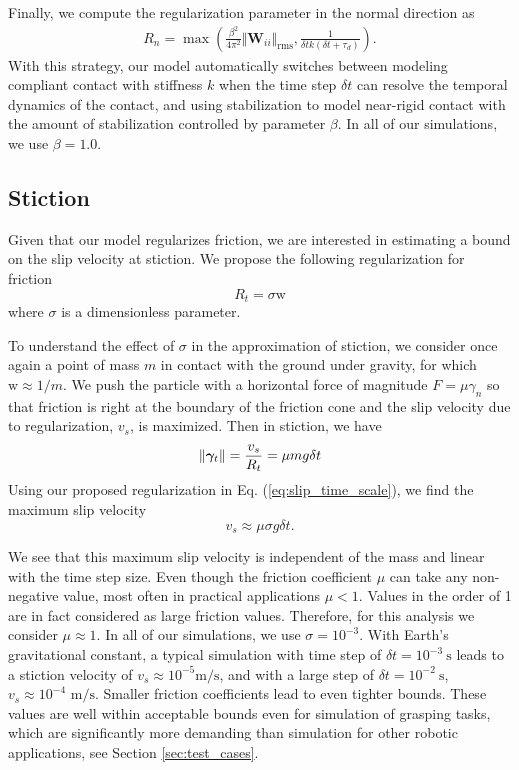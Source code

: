 Finally, we compute the regularization parameter in the normal direction as
\begin{eqnarray}
    R_n = \max\left(\frac{\beta^2}{4\pi^2}\Vert\mathbf{W}_{ii}\Vert_\text{rms}, 
    \frac{1}{\delta t k(\delta t+\tau_d)}\right)
    \label{eq:normal_regularization}.
\end{eqnarray}
With this strategy, our model automatically switches between modeling compliant
contact with stiffness $k$ when the time step $\delta t$ can resolve the
temporal dynamics of the contact, and using stabilization to model near-rigid
contact with the amount of stabilization controlled by parameter
$\beta$. In all of our simulations, we use $\beta=1.0$.

\subsection{Stiction}
Given that our model regularizes friction, we are interested in estimating a bound on
the slip velocity at stiction. We propose the following regularization for friction
\begin{equation}
    R_t = \sigma \text{w}
    \label{eq:slip_time_scale}
\end{equation}
where $\sigma$ is a dimensionless parameter.

To understand the effect of $\sigma$ in the approximation of stiction, we
consider once again a point of mass $m$ in contact with the ground under gravity,
for which $\text{w}\approx 1/m$. We push the particle with a horizontal force of magnitude
$F=\mu\gamma_n$ so that friction is right at the boundary of the friction cone and
the slip velocity due to regularization, $v_s$, is maximized. Then in stiction, we have
\begin{equation}
    \|{\bm\gamma}_t\| = \frac{v_s}{R_t} = \mu m g \delta t
\end{equation}
Using our proposed regularization in Eq. (\ref{eq:slip_time_scale}), we find
the maximum slip velocity
\begin{equation}
    v_s \approx \mu\sigma g \delta t.
    \label{eq:slip_estimation}
\end{equation}

We see that this maximum slip velocity is independent of the mass and linear
with the time step size. Even though the friction coefficient $\mu$ can take any
non-negative value, most often in practical applications $\mu < 1$. Values in the
order of 1 are in fact considered as large friction values. Therefore, for this
analysis we consider $\mu\approx 1$.
In all of our simulations, we use $\sigma=10^{-3}$. With
Earth's gravitational constant, a typical simulation with time step of $\delta
t=10^{-3}~\text{s}$ leads to a stiction velocity of $v_s\approx
10^{-5}\text{m}/\text{s}$, and with a large step of $\delta t=10^{-2}~\text{s}$,
$v_s\approx 10^{-4}\text{ m}/\text{s}$. Smaller friction coefficients lead to
even tighter bounds. These values are well within acceptable bounds even for
simulation of grasping tasks, which are significantly more demanding than
simulation for other robotic applications, see Section \ref{sec:test_cases}.

